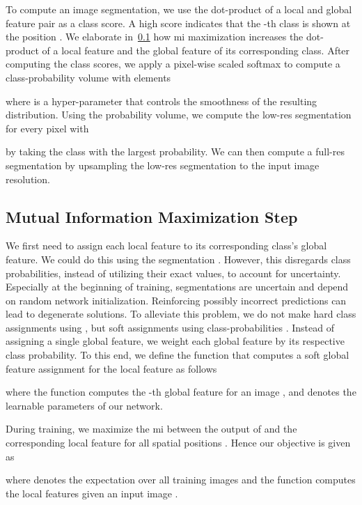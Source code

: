 To compute an image segmentation, we use the dot-product of a local and global feature pair  as a class score.
A high score indicates that the -th class is shown at the position .
We elaborate in~\cref{sec:mumax} how \gls{mi} maximization increases the dot-product of a local feature and the global feature of its corresponding class.
After computing the class scores, we apply a pixel-wise scaled softmax to compute a class-probability volume  with elements

where  is a hyper-parameter that controls the smoothness of the resulting distribution.
Using the probability volume, we compute the low-res segmentation  for every pixel  with

by taking the class with the largest probability.
We can then compute a full-res segmentation  by upsampling the low-res segmentation  to the input image resolution. 

\subsection{Mutual Information Maximization Step}
\label{sec:mumax}
We first need to assign each local feature to its corresponding class's global feature.
We could do this using the segmentation .
However, this disregards class probabilities, instead of utilizing their exact values, \eg to account for uncertainty.
Especially at the beginning of training, segmentations are uncertain and depend on random network initialization.
Reinforcing possibly incorrect predictions can lead to degenerate solutions.
To alleviate this problem, we do not make hard class assignments using , but soft assignments using class-probabilities .
Instead of assigning a single global feature, we weight each global feature by its respective class probability.
To this end, we define the function  that computes a soft global feature assignment for the local feature  as follows

where the function  computes the -th global feature  for an image , and  denotes the learnable parameters of our network.

During training, we maximize the \gls{mi} between the output of  and the corresponding local feature  for all spatial positions .
Hence our objective is given as

where  denotes the expectation over all training images  and the function  computes the local features  given an input image .


